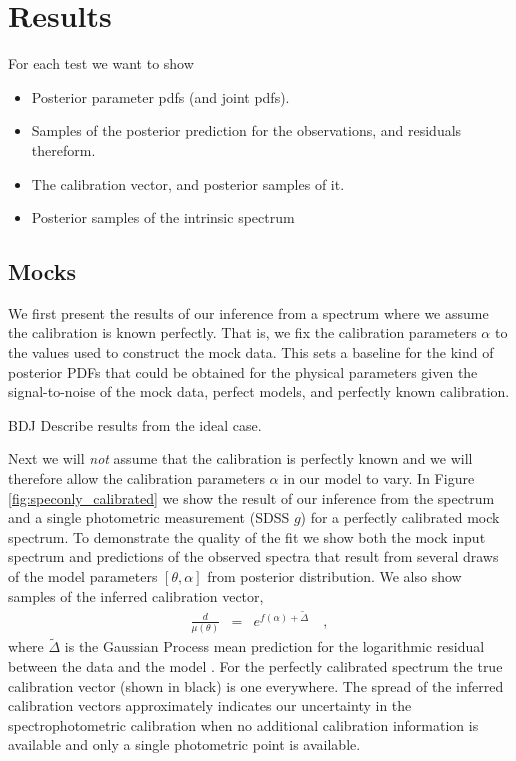 \documentclass[iop,numberedappendix]{emulateapj}
\begin{document}
\section{Results}

For each test we want to show
\begin{itemize}

\item Posterior parameter pdfs (and joint pdfs).

\item Samples of the posterior prediction for the observations, and
  residuals thereform.

\item The calibration vector, and posterior samples of it.

\item Posterior samples of the intrinsic spectrum
\end{itemize}

\subsection{Mocks}
We first present the results of our inference from a spectrum where we
assume the calibration is known perfectly.  That is, we fix the
calibration parameters $\alpha$ to the values used to construct the
mock data.  This sets a baseline for the kind of posterior PDFs that
could be obtained for the physical parameters given the
signal-to-noise of the mock data, perfect models, and perfectly known
calibration.

{\color{blue}BDJ Describe results from the ideal case.}

Next we will \emph{not} assume that the calibration is perfectly known
and we will therefore allow the calibration parameters $\alpha$ in our
model to vary.  In Figure
\ref{fig:speconly_calibrated} we show the result of our inference from
the spectrum and a single photometric measurement (SDSS $g$) for a
perfectly calibrated mock spectrum. To demonstrate the quality of the
fit we show both the mock input spectrum and predictions of the
observed spectra that result from several draws of the model
parameters $[\theta, \alpha]$ from posterior distribution.  We also
show samples of the inferred calibration vector,
\begin{eqnarray} \label{eq:calibration}
\frac{d}{\mu(\theta)} & = & e^{f(\alpha) + \tilde{\Delta}}
\quad ,
\end{eqnarray}
where $\tilde{\Delta}$ is the Gaussian Process mean prediction for the
logarithmic residual between the data and the model \citep{RW}.  For the
perfectly calibrated spectrum the true calibration vector (shown in
black) is one everywhere.  The spread of the inferred calibration
vectors approximately indicates our uncertainty in the spectrophotometric
calibration when no additional calibration information is available
and only a single photometric point is available.
\end{document}
